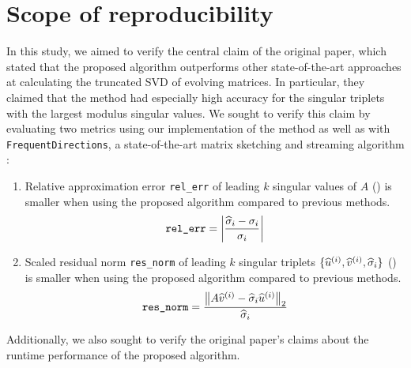 \section{Scope of reproducibility}
\label{sec:scope}

In this study, we aimed to verify the central claim of the original paper, which stated that the proposed algorithm outperforms other state-of-the-art approaches at calculating the truncated SVD of evolving matrices.
In particular, they claimed that the method had especially high accuracy for the singular triplets with the largest modulus singular values.
We sought to verify this claim by evaluating two metrics using our implementation of the method as well as with \verb|FrequentDirections|, a state-of-the-art matrix sketching and streaming algorithm \cite{Ghashami2016}:
\begin{enumerate}
    \item Relative approximation error \verb|rel_err| of leading $k$ singular values of $A$ () is smaller when using the proposed algorithm compared to previous methods.
    \begin{equation}
        \verb|rel_err| = \abs{\dfrac{\hsigj{i}-\sigj{i}}{\sigj{i}}}
        \label{eq:rel_error}
    \end{equation}
    
    \item Scaled residual norm \verb|res_norm| of leading $k$ singular triplets $\{ \widehat{u}^{(i)}, \widehat{v}^{(i)}, \widehat{\sigma}_{i} \}$ () is smaller when using the proposed algorithm compared to previous methods.
    \begin{equation}
        \verb|res_norm| = \dfrac{\norm{A \hvj{i} - \hsigj{i} \huj{i}}_2}{\hsigj{i}}
        \label{eq:res_norm}
    \end{equation}
\end{enumerate}
Additionally, we also sought to verify the original paper's claims about the runtime performance of the proposed algorithm.
